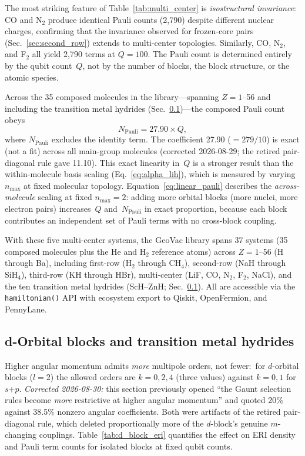 \documentclass[aps,pra,twocolumn,superscriptaddress,longbibliography]{revtex4-2}
\newcommand{\gvq}[2]{#2}
\begin{document}
The most striking feature of Table~\ref{tab:multi_center} is
\emph{isostructural invariance}: CO and N$_2$ produce identical
Pauli counts (2{,}790) despite different nuclear charges, confirming
that the invariance observed for frozen-core pairs
(Sec.~\ref{sec:second_row}) extends to multi-center topologies.
Similarly, CO, N$_2$, and F$_2$ all yield 2{,}790 terms at
$Q = 100$.  The Pauli count is determined entirely by the qubit
count~$Q$, not by the number of blocks, the block structure, or the
atomic species.

Across the 35 composed molecules in the library---spanning
$Z = 1$--56 and including the transition metal hydrides
(Sec.~\ref{sec:d_orbitals})---the composed Pauli count obeys
\begin{equation}
  N_{\mathrm{Pauli}} = \gvq{composed_coeff}{27.90} \times Q,
  \label{eq:linear_pauli}
\end{equation}
where $N_{\mathrm{Pauli}}$ excludes the identity term.
The coefficient \gvq{composed_coeff}{27.90} ($= 279/10$) is exact (not a fit) across all main-group
molecules (corrected 2026-08-29; the retired pair-diagonal rule gave 11.10).
This exact linearity in~$Q$
is a stronger result than the within-molecule basis scaling
(Eq.~\ref{eq:alpha_lih}), which is measured by
varying $n_{\max}$ at fixed molecular topology.
Equation~\eqref{eq:linear_pauli} describes the \emph{across-molecule}
scaling at fixed $n_{\max} = 2$: adding more orbital blocks (more
nuclei, more electron pairs) increases~$Q$ and~$N_{\mathrm{Pauli}}$
in exact proportion, because each block contributes an independent
set of Pauli terms with no cross-block coupling.

With these five multi-center systems, the GeoVac library spans
37 systems (35 composed molecules plus the He and H$_2$ reference atoms)
across $Z = 1$--56 (H through Ba), including first-row
(H$_2$ through CH$_4$), second-row (NaH through SiH$_4$),
third-row (KH through HBr), multi-center (LiF, CO, N$_2$, F$_2$, NaCl),
and the ten transition metal hydrides (ScH--ZnH;
Sec.~\ref{sec:d_orbitals}).  All are accessible via the
\texttt{hamiltonian()} API with ecosystem export to Qiskit,
OpenFermion, and PennyLane.


\subsection{d-Orbital blocks and transition metal hydrides}
\label{sec:d_orbitals}

Higher angular momentum admits \emph{more} multipole orders, not
fewer:\ for $d$-orbital blocks ($l = 2$) the allowed orders are
$k = 0, 2, 4$ (three values) against $k = 0, 1$ for $s$+$p$.
\emph{Corrected 2026-08-30:} this section previously opened ``the Gaunt
selection rules become \emph{more} restrictive at higher angular
momentum'' and quoted 20\% against 38.5\% nonzero angular coefficients.
Both were artifacts of the retired pair-diagonal rule, which deleted
proportionally more of the $d$-block's genuine $m$-changing couplings.
Table~\ref{tab:d_block_eri} quantifies the
effect on ERI density and Pauli term counts for isolated blocks at
fixed qubit counts.
\end{document}
